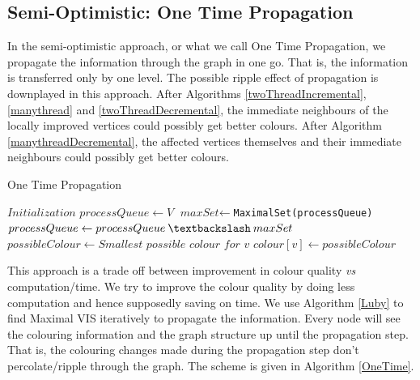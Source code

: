 \documentclass[MTech]{iitmdiss}
\begin{document}
\subsection{Semi-Optimistic: One Time Propagation}
In the semi-optimistic approach, or what we call One Time Propagation, we propagate the information through the graph in one go. That is, the information is transferred only by one level. The possible ripple effect of propagation is downplayed in this approach. After Algorithms \ref{twoThreadIncremental}, \ref{manythread} and \ref{twoThreadDecremental}, the immediate neighbours of the locally improved vertices could possibly get better colours. After Algorithm \ref{manythreadDecremental}, the affected vertices themselves and their immediate neighbours could possibly get better colours.

\begin{algorithm}
\caption{One Time Propagation}\label{OneTime}
\begin{algorithmic}[1]
\State $\textit{Initialization}$
\State $\textit{processQueue} \gets V$
\State $\textit{maxSet} \gets $\verb+MaximalSet(processQueue)+
\State $processQueue \gets processQueue \: \textbackslash \: maxSet$
\State $possibleColour \gets \textit{Smallest possible colour for v}$
\State $colour[v] \gets possibleColour$
\EndIf
\EndFor
\EndWhile
\EndProcedure
\end{algorithmic}
\end{algorithm}

This approach is a trade off between improvement in colour quality \textit{vs} computation/time. We try to improve the colour quality by doing less computation and hence supposedly saving on time. We use Algorithm \ref{Luby} to find Maximal VIS iteratively to propagate the information. Every node will see the colouring information and the graph structure up until the propagation step. That is, the colouring changes made during the propagation step don't percolate/ripple through the graph. The scheme is given in Algorithm \ref{OneTime}.
\end{document}
